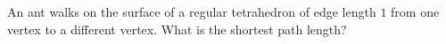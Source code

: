 An ant walks on the surface of a regular tetrahedron of edge length $1$ from one vertex to a different vertex. What is the shortest path length?
